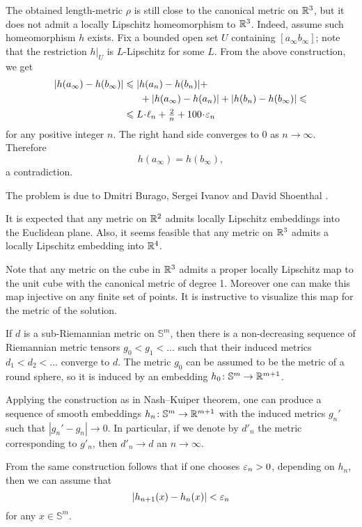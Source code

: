 The obtained length-metric $\rho$ is still close to the canonical metric on $\mathbb{R}^3$,
but it does not admit 
a locally Lipschitz homeomorphism to $\mathbb{R}^3$.
Indeed, 
assume such homeomorphism $h$ exists.
Fix a bounded open set $U$ containing $[a_\infty b_\infty]$;
note that the restriction $h|_U$ is $L$-Lipschitz for some $L$.
From the above construction,
we get 
\begin{align*}
|h(a_\infty)-h(b_\infty)|
&\le 
|h(a_n)-h(b_n)|
+
\\
&\ \ \ \ \ +
|h(a_\infty)-h(a_n)|
+
|h(b_n)-h(b_\infty)|
\le
\\
&\le
L\cdot\ell_n+\tfrac2n+100\cdot\eps_n
\end{align*}
for any positive integer $n$.
The right hand side converges to $0$ as $n\to\infty$.
Therefore 
\[h(a_\infty)=h(b_\infty),\] 
a contradiction.\qeds



The problem is due to
Dmitri Burago, 
Sergei Ivanov 
and David Shoenthal \cite[see][]{BIS}.

It is expected that any metric on $\mathbb{R}^2$ admits locally Lipschitz embeddings into the Euclidean plane.
Also, it seems feasible that any metric on $\mathbb{R}^3$ admits a locally Lipschitz embedding into $\mathbb{R}^4$.

Note that any metric on the cube in $\mathbb{R}^3$ admits a proper locally Lipschitz map to the unit cube with the canonical metric of degree 1.
Moreover one can make this map injective on any finite set of points.
It is instructive to visualize this map for the metric of the solution.

If $d$ is a sub-Riemannian metric on $\mathbb{S}^m$,
then there is a non-decreasing sequence of Riemannian metric tensors
$g_0< g_1<\dots$ such that their induced metrics $d_1<d_2<\dots$ converge to $d$.
The metric $g_0$ can be assumed to be the metric of a round sphere,
so it is induced by an embedding $h_0\colon\mathbb{S}^m\to \mathbb{R}^{m+1}$.

Applying the construction as in Nash--Kuiper theorem,
one can produce a sequence of smooth embeddings $h_n\colon\mathbb{S}^m\to \mathbb{R}^{m+1}$ with the induced metrics $g_n'$
such that $|g_n'-g_n|\to 0$.
In particular, if we denote by $d'_n$ the metric corresponding to $g'_n$, then $d'_n\to d$ an $n\to\infty$.

From the same construction follows that
if one chooses $\varepsilon_n>0$, depending on $h_n$,
then we can assume that 
\[|h_{n+1}(x)-h_n(x)|<\varepsilon_n\] for any $x\in \mathbb{S}^m$.

